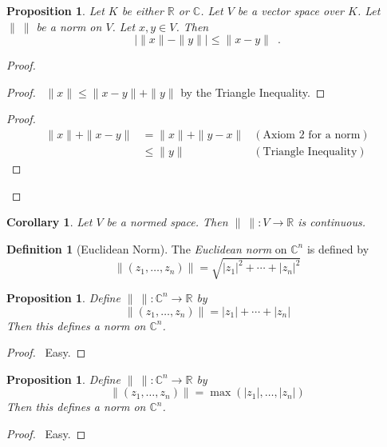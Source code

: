 \documentclass{book}
\let\qed\relax
\newtheorem{prop}[ax]{Proposition}
\newtheorem{cor}{Corollary}[ax]
\theoremstyle{definition}
\newtheorem{df}[ax]{Definition}
\begin{document}
\begin{prop}
\label{prop:distancebetweennorms}
Let $K$ be either $\mathbb{R}$ or $\mathbb{C}$. Let $V$ be a vector space over $K$. Let $\|\ \|$ be a norm on $V$. Let $x,y \in V$. Then
\[ | \| x \| - \| y \| | \leq \| x - y \| \enspace . \]
\end{prop}

\begin{proof}
\pf
{}
\begin{proof}
	\pf\ $\|x\| \leq \| x - y \| + \|y \|$ by the Triangle Inequality.
\end{proof}
\begin{proof}
	\pf
	\begin{align*}
		\| x \| + \| x - y \| & = \| x \| + \| y - x\| & (\text{Axiom 2 for a norm}) \\
		& \leq \| y \| & (\text{Triangle Inequality})
	\end{align*}
\end{proof}
\qed
\end{proof}

\begin{cor}
Let $V$ be a normed space. Then $\|\ \| : V \rightarrow \mathbb{R}$ is continuous.
\end{cor}

\begin{df}[Euclidean Norm]
The \emph{Euclidean norm} on $\mathbb{C}^n$ is defined by
\[ \| (z_1, \ldots, z_n) \| = \sqrt{|z_1|^2 + \cdots + |z_n|^2} \]
\end{df}

\begin{prop}
Define $\|\ \| : \mathbb{C}^n \rightarrow \mathbb{R}$ by
\[ \| (z_1, \ldots, z_n) \| = |z_1| + \cdots + |z_n| \]
Then this defines a norm on $\mathbb{C}^n$.
\end{prop}

\begin{proof}
\pf\ Easy. \qed
\end{proof}

\begin{prop}
Define $\|\ \| : \mathbb{C}^n \rightarrow \mathbb{R}$ by
\[ \| (z_1, \ldots, z_n) \| = \max(|z_1|, \ldots, |z_n|) \]
Then this defines a norm on $\mathbb{C}^n$.
\end{prop}

\begin{proof}
\pf\ Easy. \qed
\end{proof}
\end{document}
